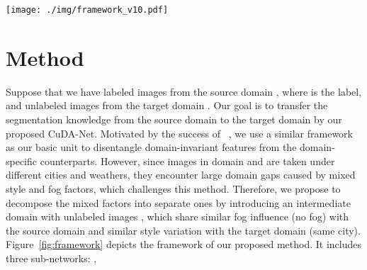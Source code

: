 \documentclass[10pt,twocolumn,letterpaper]{article}
\begin{document}
\begin{figure*}[t]
\centering
\texttt{[image: ./img/framework\_v10.pdf]}\\
\caption{\textbf{The proposed method}. \textbf{a}, The feature disentanglement network (FDN) disentangles domain-invariant content features from the domain-specific counterparts for images from two different domains. \textbf{b}, By introducing the intermediate domain , we can obtain three different input domain combinations, ,  and , for three FDNs, ,  and , to tackle the style gap, the fog gap and the dual gap respectively.
Three FDNs are trained one by one, where the domain-invariant knowledge is shared.
As there are no labels for both domain  and , we use  to tag domain  for training . 
\textbf{d}, The whole pipeline. We first initialize three FDNs by training each of them once, as in \textbf{b}. Then, we conduct cyclical training, using the cumulative relation (\textbf{c}) as an auxiliary loss, for better disentangling the domain-invariant (content) features, which are used to produce segmentation heatmaps.}
\vspace{-2mm}
\label{fig:framework}
\end{figure*}


















\section{Method}



Suppose that we have  labeled images  from the source domain , 
where  is the label,
and  unlabeled images
 from the target domain . 
Our goal is to transfer the segmentation knowledge from the source domain  to the target domain  by our proposed CuDA-Net.
Motivated by the success of ~\cite{chang2019all}, we use a similar framework as our basic unit to disentangle domain-invariant features from the domain-specific counterparts.
However, since images in domain  and  are taken under different cities and weathers, they encounter large domain gaps caused by mixed style and fog factors, which challenges this method.
Therefore, we propose to decompose the mixed factors into separate ones by introducing an intermediate domain  with  unlabeled images , which share similar fog influence (no fog) with the source domain and similar style variation with the target domain (same city).
Figure~\ref{fig:framework} depicts the framework of our proposed method. 
It includes three sub-networks: 
, 
 
\end{document}
